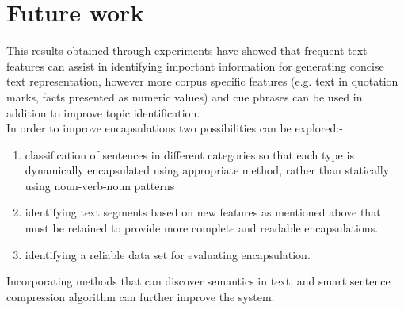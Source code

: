 \section{Future work}
This results obtained through experiments have showed that frequent text features can assist in identifying important information for generating concise text 
representation, however more corpus specific features (e.g. text in quotation marks, facts presented as numeric values) and cue phrases can be used in addition to
improve topic identification. \\
In order to improve encapsulations two possibilities can be explored:-
\begin{enumerate}
 \item classification of sentences in different categories so that each type is dynamically encapsulated using appropriate method, rather than statically using
 noun-verb-noun patterns
 \item identifying text segments based on new features as mentioned above that must be retained to provide more complete and readable encapsulations. 
 \item identifying a reliable data set for evaluating encapsulation.
\end{enumerate}
Incorporating methods that can discover semantics in text, and smart sentence compression algorithm can further improve the system.